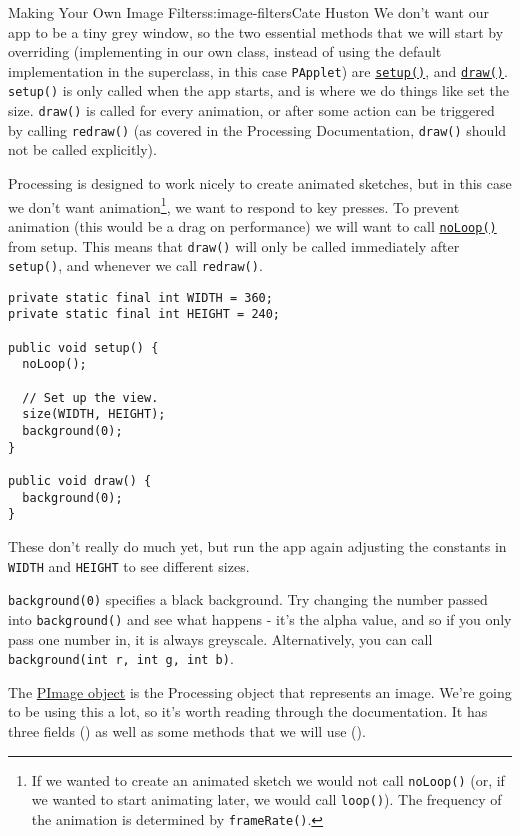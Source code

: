 \begin{aosachapter}{Making Your Own Image Filters}{s:image-filters}{Cate Huston}
We don't want our app to be a tiny grey window, so the two essential
methods that we will start by overriding (implementing in our own class,
instead of using the default implementation in the superclass, in this
case \texttt{PApplet}) are
\href{http://processing.org/reference/setup_.html}{\texttt{setup()}},
and \href{http://processing.org/reference/draw_.html}{\texttt{draw()}}.
\texttt{setup()} is only called when the app starts, and is where we do
things like set the size. \texttt{draw()} is called for every animation,
or after some action can be triggered by calling \texttt{redraw()} (as
covered in the Processing Documentation, \texttt{draw()} should not be
called explicitly).

Processing is designed to work nicely to create animated sketches, but
in this case we don't want animation\footnote{If we wanted to create an
  animated sketch we would not call \texttt{noLoop()} (or, if we wanted
  to start animating later, we would call \texttt{loop()}). The
  frequency of the animation is determined by \texttt{frameRate()}.}, we
want to respond to key presses. To prevent animation (this would be a
drag on performance) we will want to call
\href{http://www.processing.org/reference/noLoop_.html}{\texttt{noLoop()}}
from setup. This means that \texttt{draw()} will only be called
immediately after \texttt{setup()}, and whenever we call
\texttt{redraw()}.

\begin{verbatim}
private static final int WIDTH = 360;
private static final int HEIGHT = 240;

public void setup() {
  noLoop();

  // Set up the view.
  size(WIDTH, HEIGHT);
  background(0);
}
    
public void draw() {
  background(0);
}
\end{verbatim}

These don't really do much yet, but run the app again adjusting the
constants in \texttt{WIDTH} and \texttt{HEIGHT} to see different sizes.

\texttt{background(0)} specifies a black background. Try changing the
number passed into \texttt{background()} and see what happens - it's the
alpha value, and so if you only pass one number in, it is always
greyscale. Alternatively, you can call
\texttt{background(int r, int g, int b)}.

\label{pimage}

The \href{http://processing.org/reference/PImage.html}{PImage object} is
the Processing object that represents an image. We're going to be using
this a lot, so it's worth reading through the documentation. It has
three fields () as well as
some methods that we will use
().


\end{aosachapter}
